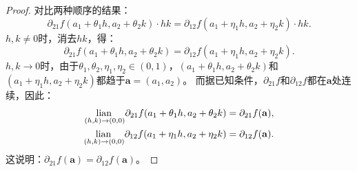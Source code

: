 \documentclass[12pt,UTF8,fontset=none]{ctexbook}
\begin{document}
\begin{appendix}
\begin{proof}
对比两种顺序的结果：
$$ \partial_{21} f(a_1 + \theta_1 h, a_2 + \theta_2 k) \cdot h k = \partial_{12} f(a_1 + \eta_1 h, a_2 + \eta_2 k) \cdot h k. $$
$h, k \neq 0$时，消去$h k$，得：
$$ \partial_{21} f(a_1 + \theta_1 h, a_2 + \theta_2 k) = \partial_{12} f(a_1 + \eta_1 h, a_2 + \eta_2 k). $$
$h, k \to 0$时，由于$\theta_1, \theta_2, \eta_1, \eta_2 \in (0, 1)$，$(a_1 + \theta_1 h, a_2 + \theta_2 k)$和$(a_1 + \eta_1 h, a_2 + \eta_2 k)$都趋于$\mathbf{a}=(a_1, a_2)$。
而据已知条件，$\partial_{21} f$和$\partial_{12} f$都在$\mathbf{a}$处连续，因此：
\begin{align*}
\underset{(h,k)\to (0,0)}{\operatorname{lian}\,} \partial_{21} f(a_1 + \theta_1 h, a_2 + \theta_2 k) &= \partial_{21} f(\mathbf{a}), \\
\underset{(h,k)\to (0,0)}{\operatorname{lian}\,} \partial_{12} f(a_1 + \eta_1 h, a_2 + \eta_2 k) &= \partial_{12} f(\mathbf{a}).
\end{align*}
这说明：$\partial_{21} f(\mathbf{a}) = \partial_{12} f(\mathbf{a})$。
\end{proof}


\end{appendix}
\end{document}
